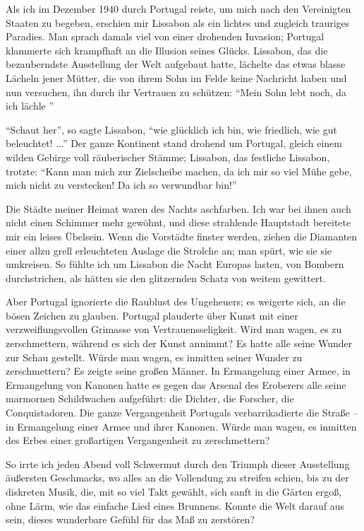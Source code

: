 \documentclass[12pt,ngerman,draft]{scrartcl}
\begin{document}
Als ich im Dezember 1940 durch Portugal reiste, um mich nach den Vereinigten Staaten zu begeben, erschien mir Lissabon als ein lichtes und zugleich trauriges Paradies. Man sprach damals viel von einer drohenden Invasion; Portugal klammerte sich krampfhaft an die Illusion seines Glücks. Lissabon, das die bezauberndste Ausstellung der Welt aufgebaut hatte, lächelte das etwas blasse Lächeln jener Mütter, die von ihrem Sohn im Felde keine Nachricht haben und nun versuchen, ihn durch ihr Vertrauen zu schützen: \enquote{Mein Sohn lebt noch, da ich lächle }

\enquote{Schaut her}, so sagte Lissabon, \enquote{wie glücklich ich bin, wie friedlich, wie gut beleuchtet! ...} Der ganze Kontinent stand drohend um Portugal, gleich einem wilden Gebirge voll räuberischer Stämme; Lissabon, das festliche Lissabon, trotzte: \enquote{Kann man mich zur Zielscheibe machen, da ich mir so viel Mühe gebe, mich nicht zu verstecken! Da ich so verwundbar bin!}

Die Städte meiner Heimat waren des Nachts aschfarben. Ich war bei ihnen auch nicht einen Schimmer mehr gewöhnt, und diese strahlende Hauptstadt bereitete mir ein leises Übelsein. Wenn die Vorstädte finster werden, ziehen die Diamanten einer allzu grell erleuchteten Auslage die Strolche an; man spürt, wie sie sie umkreisen. So fühlte ich um Lissabon die Nacht Europas lasten, von Bombern durchstrichen, als hätten sie den glitzernden Schatz von weitem gewittert.

Aber Portugal ignorierte die Raublust des Ungeheuers; es weigerte sich, an die bösen Zeichen zu glauben. Portugal plauderte über Kunst mit einer verzweiflungsvollen Grimasse von Vertrauensseligkeit. Wird man wagen, es zu zerschmettern, während es sich der Kunst annimmt? Es hatte alle seine Wunder zur Schau gestellt. Würde man wagen, es inmitten seiner Wunder zu zerschmettern? Es zeigte seine großen Männer. In Ermangelung einer Armee, in Ermangelung von Kanonen hatte es gegen das Arsenal des Eroberers alle seine marmornen Schildwachen aufgeführt: die Dichter, die Forscher, die Conquistadoren. Die ganze Vergangenheit Portugals verbarrikadierte die Straße -- in Ermangelung einer Armee und ihrer Kanonen. Würde man wagen, es inmitten des Erbes einer großartigen Vergangenheit zu zerschmettern?

So irrte ich jeden Abend voll Schwermut durch den Triumph dieser Ausstellung äußersten Geschmacks, wo alles an die Vollendung zu streifen schien, bis zu der diskreten Musik, die, mit so viel Takt gewählt, sich sanft in die Gärten ergoß, ohne Lärm, wie das einfache Lied eines Brunnens. Konnte die Welt darauf aus sein, dieses wunderbare Gefühl für das Maß zu zerstören?
\end{document}
